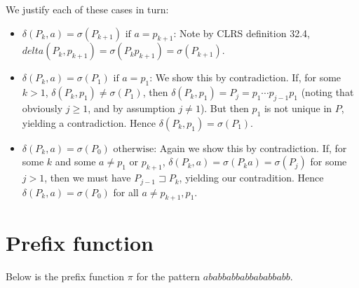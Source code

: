 \documentclass[paper=a4, fontsize=11pt]{scrartcl} %
\numberwithin{equation}{section} %
\numberwithin{figure}{section} %
\numberwithin{table}{section} %
\begin{document}
We justify each of these cases in turn:
\begin{itemize}
\item $\delta(P_k, a) = \sigma(P_{k + 1}) \textrm{ if } a = p_{k + 1}$: Note by CLRS definition 32.4, $delta(P_k, p_{k+1}) = \sigma(P_{k}p_{k+1}) = \sigma(P_{k + 1})$.
\item $\delta(P_k, a) = \sigma(P_{1}) \textrm{ if } a = p_{1}$: We show this by contradiction. If, for some $k > 1$, $\delta(P_k, p_{1}) \ne \sigma(P_{1})$, then $\delta(P_k, p_{1}) = P_j = p_1 \cdots p_{j-1} p_1$ (noting that obviously $j \geq 1$, and by assumption $j \ne 1$). But then $p_1$ is not unique in $P$, yielding a contradiction. Hence $\delta(P_k, p_{1}) = \sigma(P_{1})$.
\item $\delta(P_k, a) = \sigma(P_{0}) \textrm{ otherwise}$: Again we show this by contradiction. If, for some $k$ and some $a \ne p_1$ or $p_{k+1}$, $\delta(P_k, a) = \sigma(P_k a) = \sigma(P_j)$ for some $j > 1$, then we must have $P_{j-1} \sqsupset P_k$, yielding our contradition. Hence $\delta(P_k, a) = \sigma(P_{0})$ for all $a \ne p_{k+1}, p_{1}$.
\end{itemize}


\section{Prefix function}

Below is the prefix function $\pi$ for the pattern $ababbabbabbababbabb$.
\end{document}
